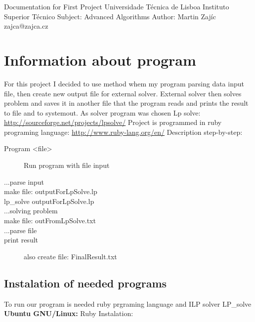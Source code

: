 \documentclass[a4paper,12pt]{article}
\renewcommand{\b}[1]{\textbf{#1}} %
\begin{document}
\begin{titlepage}
\begin{center}
Documentation for First Project\newline
\newline
Universidade Técnica de Lisboa\newline
Instituto Superior Técnico\newline
\newline
Subject: Advanced Algorithms\newline
Author: Martin Zajíc zajca@zajca.cz\newline
\newline
\end{center}
\end{titlepage}
\section{Information about program}
For this project I decided to use method whem my program parsing data input file, then create new output file for external solver. External solver then solves problem and saves it in another file that the program reads and prints the result to file and to systemout.
\newline
\newline
As solver program was chosen Lp solve: \href{http://sourceforge.net/projects/lpsolve/}{http://sourceforge.net/projects/lpsolve/}
\newline
\newline
Project is programmed in ruby programing language: \href{http://www.ruby-lang.org/en/}{http://www.ruby-lang.org/en/}
\newline
\newline
Description step-by-step:
\begin{description}
 \item[Program <file>] Run program with file input
 \item[...parse input]
 \item[make file: outputForLpSolve.lp]
 \item[lp\_solve outputForLpSolve.lp]
 \item[...solving problem]
 \item[make file: outFromLpSolve.txt]
 \item[...parse file]
 \item[print result] also create file: FinalResult.txt
 \end{description}

\subsection{Instalation of needed programs}
To run our program is needed ruby prgraming language and ILP solver LP\_solve\newline
\newline
\b{Ubuntu GNU/Linux:} \newline
Ruby Instalation:
\end{document}
